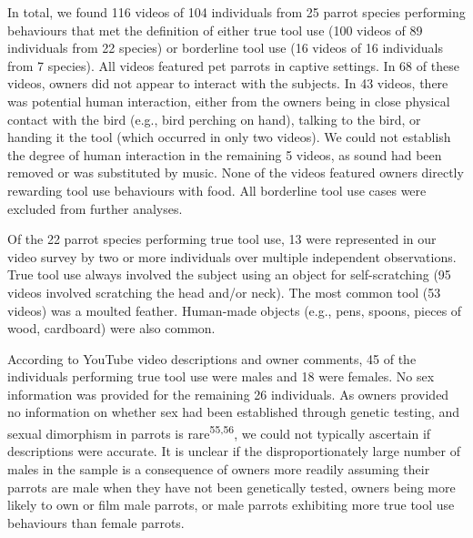 \documentclass[
  man,floatsintext]{apa6}
\begin{document}
In total, we found 116 videos of
104 individuals from
25
parrot species performing behaviours that met the definition of either true tool
use (100 videos of
89
individuals from
22
species) or borderline tool use (16 videos of
16
individuals from
7
species). All videos featured pet parrots in captive settings. In
68 of these
videos, owners did not appear to interact with the subjects. In
43 videos,
there was potential human interaction, either from the owners being in close physical
contact with the bird (e.g., bird perching on hand), talking to the bird, or
handing it the tool (which occurred in only two videos). We could not establish
the degree of human interaction in the remaining
5
videos, as sound had been removed or was substituted by music. None of the
videos featured owners directly rewarding tool use behaviours with food. All
borderline tool use cases were excluded from further analyses.

Of the 22
parrot species performing true tool use,
13
were represented in our video survey by two or more individuals over multiple
independent observations. True tool use always involved the subject using an
object for self-scratching (95
videos involved scratching the head and/or neck). The most common tool (53
videos) was a moulted feather. Human-made objects (e.g., pens, spoons, pieces of
wood, cardboard) were also common.

According to YouTube video descriptions and owner comments,
45
of the individuals performing true tool use were males and
18
were females. No sex information was provided for the remaining
26
individuals. As owners provided no information on whether sex had been
established through genetic testing, and sexual dimorphism in parrots is
rare\textsuperscript{55,56}, we could not typically ascertain if descriptions
were accurate. It is unclear if the disproportionately large number of males in
the sample is a consequence of owners more readily assuming their parrots are
male when they have not been genetically tested, owners being more likely to own
or film male parrots, or male parrots exhibiting more true tool use behaviours
than female parrots.
\end{document}
